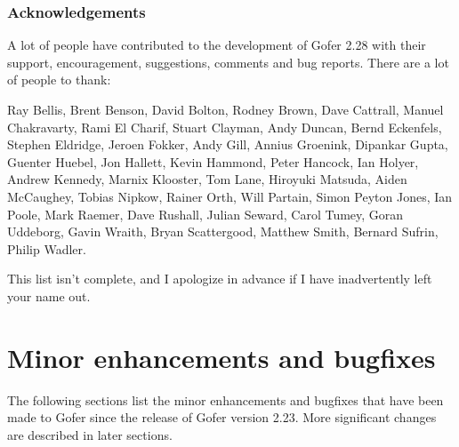 \subsubsection*{Acknowledgements}
A lot of people have contributed to the development of Gofer 2.28 with
their support, encouragement, suggestions, comments and bug reports.
There are a lot of people to thank:

                 Ray Bellis,            Brent Benson,
               David Bolton,           Rodney Brown,
                Dave Cattrall,         Manuel Chakravarty,
                Rami El Charif,        Stuart Clayman,
                Andy Duncan,            Bernd Eckenfels,
             Stephen Eldridge,         Jeroen Fokker,
                Andy Gill,             Annius Groenink,
            Dipankar Gupta,           Guenter Huebel,
                 Jon Hallett,           Kevin Hammond,
               Peter Hancock,             Ian Holyer,
              Andrew Kennedy,          Marnix Klooster,
                 Tom Lane,           Hiroyuki Matsuda,
               Aiden McCaughey,        Tobias Nipkow,
              Rainer Orth,               Will Partain,
               Simon Peyton Jones,        Ian Poole,
                Mark Raemer,             Dave Rushall,
              Julian Seward,            Carol Tumey,
               Goran Uddeborg,          Gavin Wraith,
               Bryan Scattergood,     Matthew Smith,
             Bernard Sufrin,           Philip Wadler.

This list isn't complete, and I apologize in advance if I have
inadvertently left your name out.
\newpage
\section{Minor enhancements and bugfixes}

The following sections list the minor enhancements and bugfixes that
have been made to Gofer since the release of Gofer version 2.23.  More
significant changes are described in later sections.


